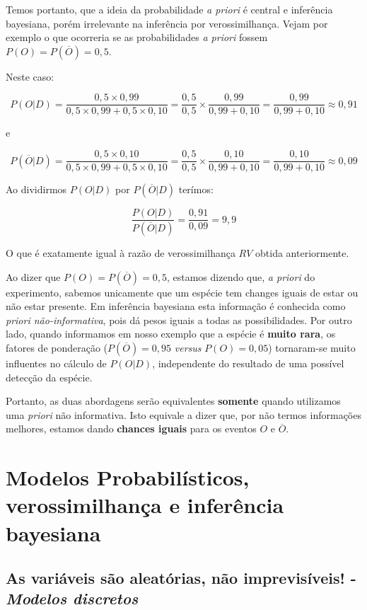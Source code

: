 \documentclass[
]{book}
\begin{document}
Temos portanto, que a ideia da probabilidade \emph{a priori} é central e inferência bayesiana, porém irrelevante na inferência por verossimilhança. Vejam por exemplo o que ocorreria se as probabilidades \emph{a priori} fossem \(P(O) = P(\overline{O}) = 0,5\).

Neste caso:

\[P(O|D) = \frac{0,5 \times 0,99}{0,5 \times 0,99 + 0,5 \times 0,10} = \frac{0,5}{0,5} \times \frac{0,99}{0,99 + 0,10} = \frac{0,99}{0,99 + 0,10} \approx 0,91 \]

e

\[P(\overline{O}|D) = \frac{0,5 \times 0,10}{0,5 \times 0,99 + 0,5 \times 0,10} = \frac{0,5}{0,5} \times \frac{0,10}{0,99 + 0,10} = \frac{0,10}{0,99 + 0,10} \approx 0,09 \]

Ao dividirmos \(P(O|D)\) por \(P(\overline{O}|D)\) terímos:

\[\frac{P(O|D)}{P(\overline{O}|D)} = \frac{0,91}{0,09} = 9,9\]

O que é exatamente igual à razão de verossimilhança \(RV\) obtida anteriormente.

Ao dizer que \(P(O) = P(\overline{O}) = 0,5\), estamos dizendo que, \emph{a priori} do experimento, sabemos unicamente que um espécie tem changes iguais de estar ou não estar presente. Em inferência bayesiana esta informação é conhecida como \emph{priori não-informativa}, pois dá pesos iguais a todas as possibilidades. Por outro lado, quando informamos em nosso exemplo que a espécie é \textbf{muito rara}, os fatores de ponderação (\(P(\overline{O}) = 0,95\) \emph{versus} \(P(O) = 0,05\)) tornaram-se muito influentes no cálculo de \(P(O|D)\), independente do resultado de uma possível detecção da espécie.

Portanto, as duas abordagens serão equivalentes \textbf{somente} quando utilizamos uma \emph{priori} não informativa. Isto equivale a dizer que, por não termos informações melhores, estamos dando \textbf{chances iguais} para os eventos \(O\) e \(\overline{O}\).

\hypertarget{part-modelos-probabiluxedsticos-verossimilhanuxe7a-e-inferuxeancia-bayesiana}{%
\part{Modelos Probabilísticos, verossimilhança e inferência bayesiana}\label{part-modelos-probabiluxedsticos-verossimilhanuxe7a-e-inferuxeancia-bayesiana}}

\hypertarget{va}{%
\chapter{\texorpdfstring{As variáveis são aleatórias, não imprevisíveis! - \emph{Modelos discretos}}{As variáveis são aleatórias, não imprevisíveis! - Modelos discretos}}\label{va}}
\end{document}
